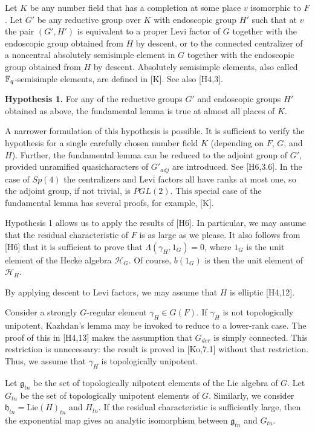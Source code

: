 \documentclass{amsart}
\newcommand\g{{\mathfrak g}}
\newcommand\h{{\mathfrak h}}
\newcommand\cH{{\mathcal H}}
\begin{document}
Let $K$ be any number field that has a completion at some place $v$
isomorphic to $F$.  Let $G'$ be any reductive group over $K$ with
endoscopic group $H'$ such that at $v$ the pair $(G',H')$ is
equivalent to a proper Levi factor of $G$ together with the endoscopic
group obtained from $H$ by descent, or to the connected centralizer of
a noncentral absolutely semisimple element in $G$ together with the
endoscopic group obtained from $H$ by descent.  Absolutely semisimple
elements, also called ${\Bbb F_q}$-semisimple elements, are defined in
[K].  See also [H4,3].

{\bf Hypothesis 1.}  For any of the reductive groups $G'$ and
endoscopic groups $H'$ obtained as above, the fundamental lemma is
true at almost all places of $K$.

A narrower formulation of this hypothesis is possible.  It is
sufficient to verify the hypothesis for a single carefully chosen
number field $K$ (depending on $F$, $G$, and $H$).  Further, the
fundamental lemma can be reduced to the adjoint group of $G'$,
provided unramified quasicharacters of $G'_{adj}$ are introduced.  See
[H6,3.6].  In the case of $Sp(4)$ the centralizers and Levi factors
all have ranks at most one, so the adjoint group, if not trivial, is
$PGL(2)$.  This special case of the fundamental lemma has several
proofs, for example, [K].

Hypothesis 1 allows us to apply the results of [H6].  In particular,
we may assume that the residual characteristic of $F$ is as large as
we please.  It also follows from [H6] that it is sufficient to prove
that $\Lambda(\gamma_H,1_G)=0$, where $1_G$ is the unit element of the
Hecke algebra $\cH_G$.  Of course, $b(1_G)$ is then the unit element
of $\cH_H$.

By applying descent to Levi factors, we may assume that $H$ is
elliptic [H4,12].

Consider a strongly $G$-regular element $\gamma_H \in G(F)$.  If
$\gamma_H$ is not topologically unipotent, Kazhdan's lemma may be
invoked to reduce to a lower-rank case.  The proof of this in [H4,13]
makes the assumption that $G_{der}$ is simply connected.  This
restriction is unnecessary: the result is proved in [Ko,7.1] without
that restriction.  Thus, we assume that $\gamma_H$ is topologically
unipotent.

Let $\g_{tn}$ be the set of topologically nilpotent elements of the
Lie algebra of $G$.  Let $G_{tu}$ be the set of topologically
unipotent elements of $G$.  Similarly, we consider $\h_{tn} =
\text{Lie}(H)_{tn}$ and $H_{tu}$.  If the residual characteristic is
sufficiently large, then the exponential map gives an analytic
isomorphism between $\g_{tn}$ and $G_{tu}$.
\end{document}
